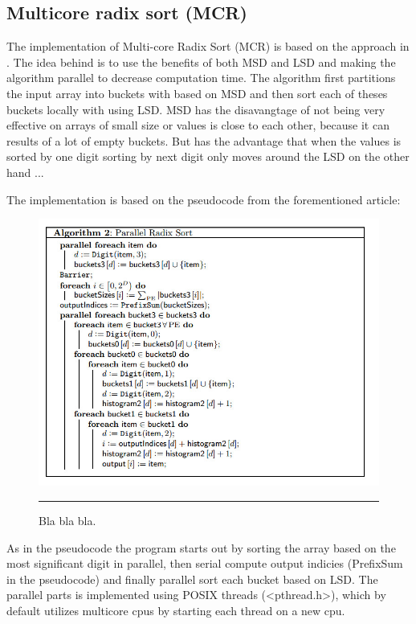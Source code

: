 \subsection{Multicore radix sort (MCR)}
The implementation of Multi-core Radix Sort (MCR) is based on the approach in \citep{radixSort}. The idea behind is to use the benefits of both MSD and LSD and making the algorithm parallel to decrease computation time. 
The algorithm first partitions the input array into buckets with based on MSD and then sort each of theses buckets locally with using LSD.  
MSD has the disavangtage of not being very effective on arrays of small size or values is close to each other, because it can results of a lot of empty buckets. 
But has the advantage that when the values is sorted by one digit sorting by next digit only moves around the 
LSD on the other hand ...

The implementation is based on the pseudocode from the forementioned article:
\begin{figure}[htbp]
	\centering
		\includegraphics[width=\textwidth]{./Figures/Project2b/MultiCoreRadix_Pseudo.jpg}
		\rule{35em}{0.5pt}
	\caption[Branch misses]{
	Bla bla bla.
	}
	\label{fig:Branch_misses}
\end{figure}
As in the pseudocode the program starts out by sorting the array based on the most significant digit in parallel, then serial compute output indicies (PrefixSum in the pseudocode) and finally parallel sort each bucket based on LSD.  
The parallel parts is implemented using POSIX threads (<pthread.h>), which by default utilizes multicore cpus by starting each thread on a new cpu.

